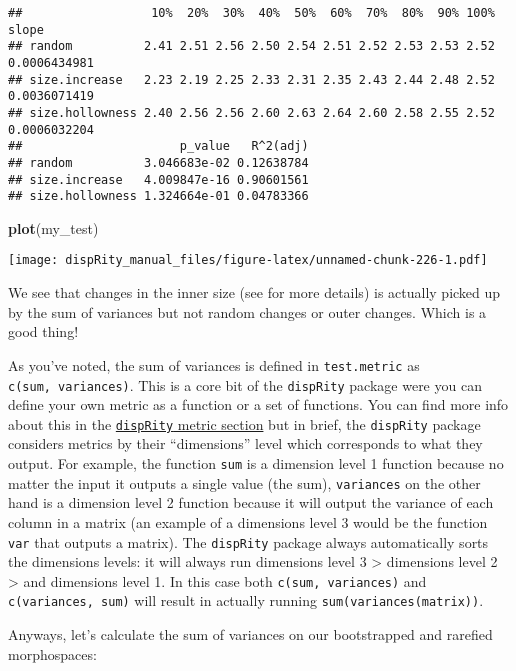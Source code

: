 \documentclass[
]{book}
\newenvironment{Shaded}{\begin{snugshade}}{\end{snugshade}}
\newcommand{\KeywordTok}[1]{\textcolor[rgb]{0.13,0.29,0.53}{\textbf{#1}}}
\newcommand{\NormalTok}[1]{#1}
\begin{document}
\begin{verbatim}
##                  10%  20%  30%  40%  50%  60%  70%  80%  90% 100%        slope
## random          2.41 2.51 2.56 2.50 2.54 2.51 2.52 2.53 2.53 2.52 0.0006434981
## size.increase   2.23 2.19 2.25 2.33 2.31 2.35 2.43 2.44 2.48 2.52 0.0036071419
## size.hollowness 2.40 2.56 2.56 2.60 2.63 2.64 2.60 2.58 2.55 2.52 0.0006032204
##                      p_value   R^2(adj)
## random          3.046683e-02 0.12638784
## size.increase   4.009847e-16 0.90601561
## size.hollowness 1.324664e-01 0.04783366
\end{verbatim}

\begin{Shaded}
\begin{Highlighting}[]
\KeywordTok{plot}\NormalTok{(my\_test)}
\end{Highlighting}
\end{Shaded}

\texttt{[image: dispRity\_manual\_files/figure-latex/unnamed-chunk-226-1.pdf]}

We see that changes in the inner size (see \citet{moms} for more details) is actually picked up by the sum of variances but not random changes or outer changes. Which is a good thing!

As you've noted, the sum of variances is defined in \texttt{test.metric} as \texttt{c(sum,\ variances)}. This is a core bit of the \texttt{dispRity} package were you can define your own metric as a function or a set of functions.
You can find more info about this in the \protect\hyperlink{disparity-metrics}{\texttt{dispRity} metric section} but in brief, the \texttt{dispRity} package considers metrics by their ``dimensions'' level which corresponds to what they output. For example, the function \texttt{sum} is a dimension level 1 function because no matter the input it outputs a single value (the sum), \texttt{variances} on the other hand is a dimension level 2 function because it will output the variance of each column in a matrix (an example of a dimensions level 3 would be the function \texttt{var} that outputs a matrix).
The \texttt{dispRity} package always automatically sorts the dimensions levels: it will always run dimensions level 3 \textgreater{} dimensions level 2 \textgreater{} and dimensions level 1. In this case both \texttt{c(sum,\ variances)} and \texttt{c(variances,\ sum)} will result in actually running \texttt{sum(variances(matrix))}.

Anyways, let's calculate the sum of variances on our bootstrapped and rarefied morphospaces:
\end{document}

